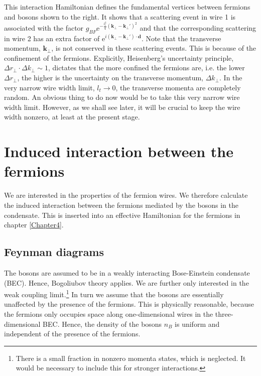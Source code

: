 This interaction Hamiltonian defines the fundamental vertices between fermions and bosons shown to the right. It shows that a scattering event in wire 1 is associated with the factor $g_{BF} \text{e}^{-\frac{l_t^2}{4}(\mathbf{k}_\perp - \mathbf{k}_\perp')^2}$ and that the corresponding scattering in wire 2 has an extra factor of $\text{e}^{i(\mathbf{k}_\perp - \mathbf{k}_\perp')\cdot \mathbf{d}}$. Note that the transverse momentum, $\mathbf{k}_{\perp}$, is not conserved in these scattering events. This is because of the confinement of the fermions. Explicitly, Heisenberg's uncertainty principle, $\Delta r_{\perp} \cdot \Delta k_{\perp} \sim 1$, dictates that the more confined the fermions are, i.e. the lower $\Delta r_{\perp}$, the higher is the uncertainty on the transverse momentum, $\Delta k_{\perp}$. In the very narrow wire width limit, $l_t \to 0$, the transverse momenta are completely random. An obvious thing to do now would be to take this very narrow wire width limit. However, as we shall see later, it will be crucial to keep the wire width nonzero, at least at the present stage.  

\section{Induced interaction between the fermions} \label{sec.1D3Dinducedinteraction}
We are interested in the properties of the fermion wires. We therefore calculate the induced interaction between the fermions mediated by the bosons in the condensate. This is inserted into an effective Hamiltonian for the fermions in chapter \ref{Chapter4}.

\subsection{Feynman diagrams} \label{subsec.Feynmandiagrams}
The bosons are assumed to be in a weakly interacting Bose-Einstein condensate (BEC). Hence, Bogoliubov theory applies. We are further only interested in the weak coupling limit.\footnote{There is a small fraction in nonzero momenta states, which is neglected. It would be necessary to include this for stronger interactions.} In turn we assume that the bosons are essentially unaffected by the presence of the fermions. This is physically reasonable, because the fermions only occupies space along one-dimensional wires in the three-dimensional BEC. Hence, the density of the bosons $n_B$ is uniform and independent of the presence of the fermions. 

